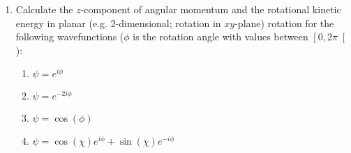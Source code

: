 \begin{enumerate}

\item Calculate the $z$-component of angular momentum and the rotational kinetic energy in planar (e.g. 2-dimensional; rotation in $xy$-plane) rotation for the following wavefunctions ($\phi$ is the rotation angle with values between $\left[0, 2\pi\right[$):

\begin{enumerate}
\item $\psi = e^{i\phi}$
\item $\psi = e^{-2i\phi}$
\item $\psi = \cos(\phi)$
\item $\psi = \cos(\chi)e^{i\phi} + \sin(\chi)e^{-i\phi}$
\end{enumerate}


\end{enumerate}
